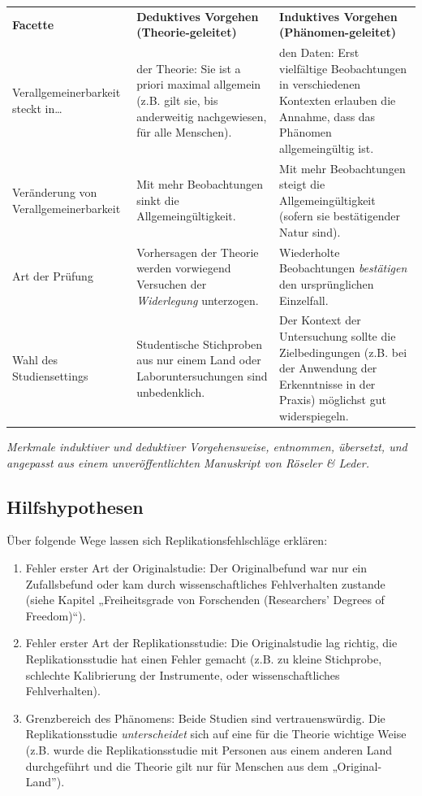 \documentclass[
  letterpaper,
  DIV=11,
  numbers=noendperiod]{scrreprt}
\begin{document}
\begin{longtable}[]{@{}
  >{\raggedright\arraybackslash}p{}
  >{\raggedright\arraybackslash}p{}
  >{\raggedright\arraybackslash}p{}@{}}
\toprule\noalign{}
\endhead
\bottomrule\noalign{}
\endlastfoot
\textbf{Facette} & \textbf{Deduktives Vorgehen (Theorie-geleitet)} &
\textbf{Induktives Vorgehen (Phänomen-geleitet)} \\
Verallgemeinerbarkeit steckt in\ldots{} & der Theorie: Sie ist a priori
maximal allgemein (z.B. gilt sie, bis anderweitig nachgewiesen, für alle
Menschen). & den Daten: Erst vielfältige Beobachtungen in verschiedenen
Kontexten erlauben die Annahme, dass das Phänomen allgemeingültig
ist. \\
Veränderung von Verallgemeinerbarkeit & Mit mehr Beobachtungen sinkt die
Allgemeingültigkeit. & Mit mehr Beobachtungen steigt die
Allgemeingültigkeit (sofern sie bestätigender Natur sind). \\
Art der Prüfung & Vorhersagen der Theorie werden vorwiegend Versuchen
der \emph{Widerlegung} unterzogen. & Wiederholte Beobachtungen
\emph{bestätigen} den ursprünglichen Einzelfall. \\
Wahl des Studiensettings & Studentische Stichproben aus nur einem Land
oder Laboruntersuchungen sind unbedenklich. & Der Kontext der
Untersuchung sollte die Zielbedingungen (z.B. bei der Anwendung der
Erkenntnisse in der Praxis) möglichst gut widerspiegeln. \\
\end{longtable}

\emph{Merkmale induktiver und deduktiver Vorgehensweise, entnommen,
übersetzt, und angepasst aus einem unveröffentlichten Manuskript von
Röseler \& Leder.}

\subsection{Hilfshypothesen}\label{hilfshypothesen}

Über folgende Wege lassen sich Replikationsfehlschläge erklären:

\begin{enumerate}
\def\labelenumi{\arabic{enumi}.}
\item
  Fehler erster Art der Originalstudie: Der Originalbefund war nur ein
  Zufallsbefund oder kam durch wissenschaftliches Fehlverhalten zustande
  (siehe Kapitel „Freiheitsgrade von Forschenden (Researchers' Degrees
  of Freedom)``).
\item
  Fehler erster Art der Replikationsstudie: Die Originalstudie lag
  richtig, die Replikationsstudie hat einen Fehler gemacht (z.B. zu
  kleine Stichprobe, schlechte Kalibrierung der Instrumente, oder
  wissenschaftliches Fehlverhalten).
\item
  Grenzbereich des Phänomens: Beide Studien sind vertrauenswürdig. Die
  Replikationsstudie \emph{unterscheidet} sich auf eine für die Theorie
  wichtige Weise (z.B. wurde die Replikationsstudie mit Personen aus
  einem anderen Land durchgeführt und die Theorie gilt nur für Menschen
  aus dem „Original-Land'').
\end{enumerate}
\end{document}
